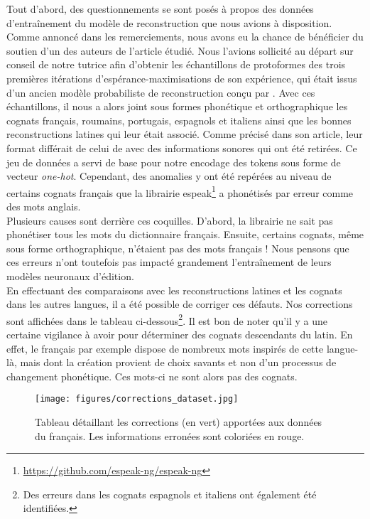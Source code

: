 \documentclass[12pt, twoside]{report}
\begin{document}
\vspace{12pt}
Tout d'abord, des questionnements se sont posés à propos des données d'entraînement du modèle de reconstruction que nous avions à disposition. Comme annoncé dans les remerciements, nous avons eu la chance de bénéficier du soutien d'un des auteurs de l'article étudié. Nous l'avions sollicité au départ sur conseil de notre tutrice afin d'obtenir les échantillons de \glspl{protoforme} des trois premières itérations d'espérance-maximisations de son expérience, qui était issus d'un ancien modèle probabiliste de reconstruction conçu par \cite{bouchard}. Avec ces échantillons, il nous a alors joint sous formes phonétique et orthographique les \glspl{cognat} français, roumains, portugais, espagnols et italiens ainsi que les bonnes reconstructions latines qui leur était associé. Comme précisé dans son article, leur format différait de celui de \cite{meloni-etal-2021-ab} avec des informations sonores qui ont été retirées. Ce jeu de données a servi de base pour notre encodage des tokens sous forme de vecteur \textit{one-hot}. Cependant, des anomalies y ont été repérées au niveau de certains \glspl{cognat} français que la librairie espeak\footnote{\url{https://github.com/espeak-ng/espeak-ng}} a phonétisés par erreur comme des mots anglais.\\
Plusieurs causes sont derrière ces coquilles. D'abord, la librairie ne sait pas phonétiser tous les mots du dictionnaire français. Ensuite, certains \glspl{cognat}, même sous forme orthographique, n'étaient pas des mots français ! Nous pensons que ces erreurs n'ont toutefois pas impacté grandement l'entraînement de leurs modèles neuronaux d'édition. \\
En effectuant des comparaisons avec les reconstructions latines et les \glspl{cognat} dans les autres langues, il a été possible de corriger ces défauts. Nos corrections sont affichées dans le tableau ci-dessous\footnote{Des erreurs dans les \glspl{cognat} espagnols et italiens ont également été identifiées.}. Il est bon de noter qu'il y a une certaine vigilance à avoir pour déterminer des \glspl{cognat} descendants du latin. En effet, le français par exemple dispose de nombreux mots inspirés de cette langue-là, mais dont la création provient de choix savants et non d'un processus de changement phonétique. Ces mots-ci ne sont alors pas des \glspl{cognat}.

\begin{figure}[!h]
    \centering
    \texttt{[image: figures/corrections\_dataset.jpg]}
    \caption{Tableau détaillant les corrections (en vert) apportées aux données du français. Les informations erronées sont coloriées en rouge.}
\end{figure}
\end{document}
